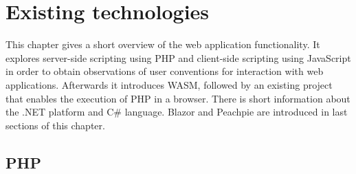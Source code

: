 \chapter{Existing technologies}

This chapter gives a short overview of the web application functionality. 
It explores server-side scripting using PHP and client-side scripting using JavaScript in order to obtain observations of user conventions for interaction with web applications.
Afterwards it introduces WASM, followed by an existing project that enables the execution of PHP in a browser.
There is short information about the .NET platform and C\# language.
Blazor and Peachpie are introduced in last sections of this chapter.

\section{PHP}

